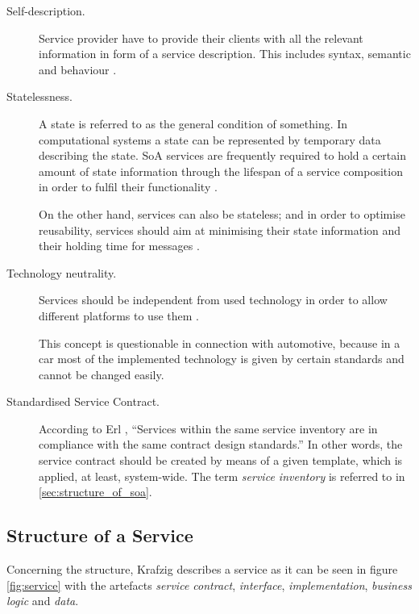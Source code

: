 \begin{description}
\item [Self-description.]
Service provider have to provide their clients with all the relevant information in form of a service description. This includes syntax, semantic and behaviour \cite{breivold}.

\item [Statelessness.]
A state is referred to as the general condition of something. In computational systems a state can be represented by temporary data describing the state. SoA services are frequently required to hold a certain amount of state information through the lifespan of a service composition in order to fulfil their functionality \cite[ch.11]{erl2008}. 

On the other hand, services can also be stateless; and in order to optimise reusability, services should aim at minimising their state information and their holding time for messages \cite{breivold} \cite[p.27]{erl2011}.

\item [Technology neutrality.]
Services should be independent from used technology in order to allow different platforms to use them \cite{breivold}. 

This concept is questionable in connection with automotive, because in a car most of the implemented technology is given by certain standards and cannot be changed easily.

\item [Standardised Service Contract.]
According to Erl \cite[p.27]{erl2011}, ``Services within the same service inventory are in compliance with the same contract design standards.'' In other words, the service contract should be created by means of a given template, which is applied, at least, system-wide. The term \emph{service inventory} is referred to in \ref{sec:structure_of_soa}.
\end{description}



\subsection{Structure of a Service}
\label{sec:service_structure}
Concerning the structure, Krafzig \cite[p.44]{krafzig} describes a service as it can be seen in figure \ref{fig:service} with the artefacts \emph{service contract}, \emph{interface}, \emph{implementation}, \emph{business logic} and \emph{data}.

